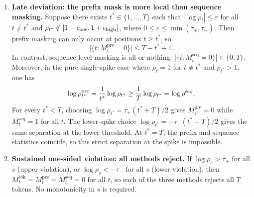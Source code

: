 \begin{theorem}
\begin{enumerate}
    \item[(b)] \textbf{Late deviation: the prefix mask is more local than sequence masking.} Suppose there exists $t^*\in\{1,\ldots,T\}$ such that
    $|\log\rho_t| \le \varepsilon$ for all $t\neq t^*$ and $\rho_{t^*}\notin[1-\epsilon_{\mathrm{low}},1+\epsilon_{\mathrm{high}}]$, where $0 \le \varepsilon \le \min(\tau_+,
    \tau_-)$. Then prefix masking can only occur at positions $t \ge t^*$, so
    \begin{equation*}
    \big|\{t : M_t^{\mathrm{pre}} = 0\}\big| \le T - t^* + 1.
    \end{equation*}
    In contrast, sequence-level masking is all-or-nothing: $|\{t : M_t^{\mathrm{seq}} = 0\}| \in \{0, T\}$. Moreover, in the pure
    single-spike case where $\rho_t=1$ for $t\neq t^*$ and $\rho_{t^*}>1$, one has
    \[
        \log\rho_{t^*}^{\mathrm{pre}} = \frac{1}{t^*}\log\rho_{t^*} \ge \frac{1}{T}\log\rho_{t^*} = \log\rho^{\mathrm{seq}},
    \]
    For every $t^*<T$, choosing $\log\rho_{t^*}=\tau_+(t^*+T)/2$ gives
    $M_{t^*}^{\mathrm{pre}}=0$ while $M_t^{\mathrm{seq}}=1$ for all $t$.
    The lower-spike choice $\log\rho_{t^*}=-\tau_-(t^*+T)/2$ gives the same
    separation at the lower threshold. At $t^*=T$, the prefix and sequence
    statistics coincide, so this strict separation at the spike is impossible.

\item[(c)] \textbf{Sustained one-sided violation: all methods reject.} If $\log\rho_s > \tau_+$ for all $s$ (upper violation), or
    $\log\rho_s < -\tau_-$ for all $s$ (lower violation), then
    $M_t^{\mathrm{tok}}=M_t^{\mathrm{pre}}=M_t^{\mathrm{seq}}=0$ for all $t$,
    so each of the three methods rejects all $T$ tokens. No monotonicity in $s$ is required.
\end{enumerate}
\end{theorem}

